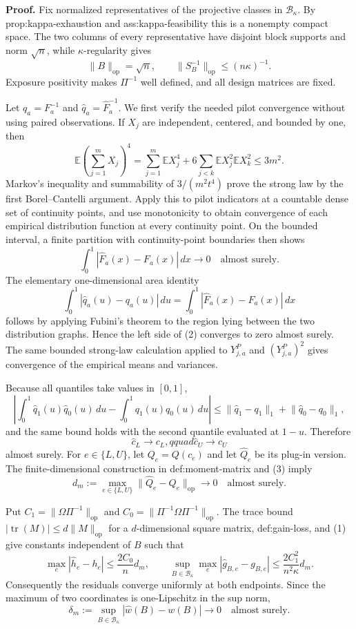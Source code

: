 \textbf{Proof.}
Fix normalized representatives of the projective classes in \(\mathcal B_\kappa\). By prop:kappa-exhaustion and ass:kappa-feasibility this is a nonempty compact space. The two columns of every representative have disjoint block supports and norm \(\sqrt n\), while \(\kappa\)-regularity gives
\[
\lVert B\rVert_{\mathrm{op}}=\sqrt n,
\qquad
\lVert S_B^{-1}\rVert_{\mathrm{op}}\le(n\kappa)^{-1}. \tag{1}
\]
Exposure positivity makes \(\Pi^{-1}\) well defined, and all design matrices are fixed.

Let \(q_a=F_a^{-1}\) and \(\widehat q_a=\widehat F_a^{-1}\). We first verify the needed pilot convergence without using paired observations. If \(X_j\) are independent, centered, and bounded by one, then
\[
\mathbb E\left(\sum_{j=1}^mX_j\right)^4
=\sum_{j=1}^m\mathbb EX_j^4
+6\sum_{j<k}\mathbb EX_j^2\mathbb EX_k^2
\le3m^2.
\]
Markov's inequality and summability of \(3/(m^2t^4)\) prove the strong law by the first Borel--Cantelli argument. Apply this to pilot indicators at a countable dense set of continuity points, and use monotonicity to obtain convergence of each empirical distribution function at every continuity point. On the bounded interval, a finite partition with continuity-point boundaries then shows
\[
\int_0^1|\widehat F_a(x)-F_a(x)|\,dx\longrightarrow0
\quad\text{almost surely}.
\]
The elementary one-dimensional area identity
\[
\int_0^1|\widehat q_a(u)-q_a(u)|\,du
=\int_0^1|\widehat F_a(x)-F_a(x)|\,dx \tag{2}
\]
follows by applying Fubini's theorem to the region lying between the two distribution graphs. Hence the left side of (2) converges to zero almost surely. The same bounded strong-law calculation applied to \(Y^P_{j,a}\) and \((Y^P_{j,a})^2\) gives convergence of the empirical means and variances.

Because all quantiles take values in \([0,1]\),
\[
\left|\int_0^1\widehat q_1(u)\widehat q_0(u)\,du-
\int_0^1q_1(u)q_0(u)\,du\right|
\le\lVert\widehat q_1-q_1\rVert_1+\lVert\widehat q_0-q_0\rVert_1,
\]
and the same bound holds with the second quantile evaluated at \(1-u\). Therefore
\[
\widehat c_L\to c_L,qquad \widehat c_U\to c_U \tag{3}
\]
almost surely. For \(e\in\{L,U\}\), let \(Q_e=Q(c_e)\) and let \(\widehat Q_e\) be its plug-in version. The finite-dimensional construction in def:moment-matrix and (3) imply
\[
d_m:=\max_{e\in\{L,U\}}\lVert\widehat Q_e-Q_e\rVert_{\mathrm{op}}\longrightarrow0
\quad\text{almost surely}. \tag{4}
\]

Put \(C_1=\lVert\Omega\Pi^{-1}\rVert_{\mathrm{op}}\) and \(C_0=\lVert\Pi^{-1}\Omega\Pi^{-1}\rVert_{\mathrm{op}}\). The trace bound \(|\operatorname{tr}(M)|\le d\lVert M\rVert_{\mathrm{op}}\) for a \(d\)-dimensional square matrix, def:gain-loss, and (1) give constants independent of \(B\) such that
\[
\max_e|\widehat h_e-h_e|\le \frac{2C_0}{n}d_m,
\qquad
\sup_{B\in\mathcal B_\kappa}\max_e|\widehat g_{B,e}-g_{B,e}|
\le\frac{2C_1^2}{n^2\kappa}d_m. \tag{5}
\]
Consequently the residuals converge uniformly at both endpoints. Since the maximum of two coordinates is one-Lipschitz in the sup norm,
\[
\delta_m:=\sup_{B\in\mathcal B_\kappa}|\widehat w(B)-w(B)|\longrightarrow0
\quad\text{almost surely}. \tag{6}
\]

